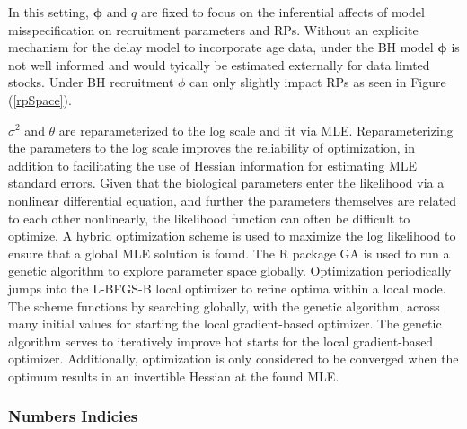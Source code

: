 %
In this setting, $\bm{\phi}$ and $q$ are fixed %
to focus on the inferential affects of model misspecification on recruitment
parameters and RPs. Without an explicite mechanism for the delay model to incorporate
age data, under the BH model $\bm{\phi}$ is not well informed and would
tyically be estimated externally for data limted stocks. Under BH recruitment
$\phi$ can only slightly impact RPs as seen in Figure (\ref{rpSpace}).

%
$\sigma^2$ and $\theta$ are reparameterized to the log scale and fit via MLE.
Reparameterizing the parameters to the log scale improves the reliability of
optimization, in addition to facilitating the use of Hessian information for
estimating MLE standard errors. Given that the biological parameters enter the
likelihood via a nonlinear differential equation, and further the parameters
themselves are related to each other nonlinearly, the likelihood function can
often be difficult to optimize. A hybrid optimization scheme is used to
maximize the log likelihood to ensure that a global MLE solution is found. The
R package GA \cite{scrucca_ga_2013, scrucca_extensions_2017} is used to
run a genetic algorithm to explore parameter space globally. Optimization
periodically jumps into the L-BFGS-B local optimizer to refine optima within a
local mode. The scheme functions by searching globally, with the genetic
algorithm, across many initial values for starting the local gradient-based
optimizer. The genetic algorithm serves to iteratively improve hot starts for
the local gradient-based optimizer. Additionally, optimization is only
considered to be converged when the optimum results in an invertible Hessian at
the found MLE.

%
\subsubsection{Numbers Indicies}

